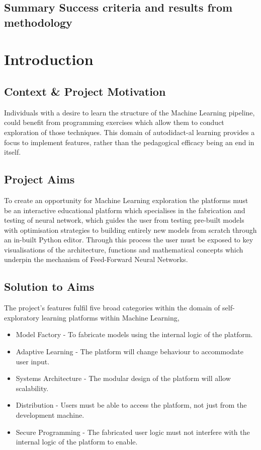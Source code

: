 \documentclass{article}
\begin{document}
\subsection{Summary Success criteria and results from methodology}

\section{Introduction}
\subsection{Context \& Project Motivation}
Individuals with a desire to learn the structure of the Machine Learning pipeline, could benefit from programming exercises which allow them to conduct exploration of those techniques. This domain of autodidact-al learning provides a focus to implement features, rather than the pedagogical efficacy being an end in itself.
\subsection{Project Aims}
To create an opportunity for Machine Learning exploration the platforms must be an interactive educational platform which specialises in the fabrication and testing of neural network, which guides the user from testing pre-built models with optimisation strategies to building entirely new models from scratch through an in-built Python editor. Through this process the user must be exposed to key visualisations of the architecture, functions and mathematical concepts which underpin the mechanism of Feed-Forward Neural Networks.
\subsection{Solution to Aims}
The project's features fulfil five broad categories within the domain of self-exploratory learning platforms within Machine Learning,

\begin{itemize}
    \item Model Factory - To fabricate models using the internal logic of the platform.
    \item Adaptive Learning - The platform will change behaviour to accommodate user input.
    \item Systems Architecture - The modular design of the platform will allow scalability.
    \item Distribution - Users must be able to access the platform, not just from the development machine.
    \item Secure Programming - The fabricated user logic must not interfere with the internal logic of the platform to enable.
\end{itemize}
\end{document}
